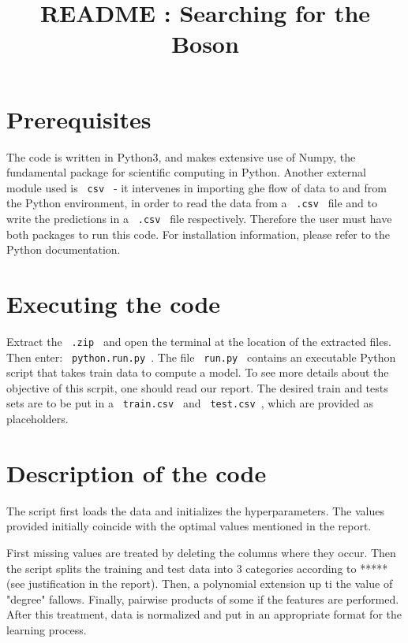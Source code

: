 \documentclass[11pt, oneside]{article}   	%
\title{README : Searching for the Boson}
\date{}
\begin{document}
\maketitle

\section{Prerequisites}

The code is written in Python3, and makes extensive use of Numpy, the fundamental package for scientific computing in Python. Another external module used is \lstinline" csv " - it intervenes in importing ghe flow of data to and from the Python environment, in order to read the data from a \lstinline" .csv " file and to write the predictions in a \lstinline" .csv " file respectively. Therefore the user must have both packages to run this code. For installation information, please refer to the Python documentation. 

\section{Executing the code}

Extract the \lstinline" .zip " and open the terminal at the location of the extracted files. Then enter: \lstinline" python.run.py ". The file \lstinline" run.py " contains an executable Python script that takes train data to compute a model. To see more details about the objective of this scrpit, one should read our report. The desired train and tests sets are to be put in a \lstinline" train.csv " and \lstinline" test.csv ", which are provided as placeholders. 

\section{Description of the code}

The script first loads the data and initializes the hyperparameters. The values provided initially coincide with the optimal values mentioned in the report. 

First missing values are treated by deleting the columns where they occur. Then the script splits the training and test data into $3$ categories according to ***** (see justification in the report). Then, a polynomial extension up ti the value of "degree" fallows. Finally, pairwise products of some if the features are performed. After this treatment, data is normalized and put in an appropriate format for the learning process.
\end{document}

